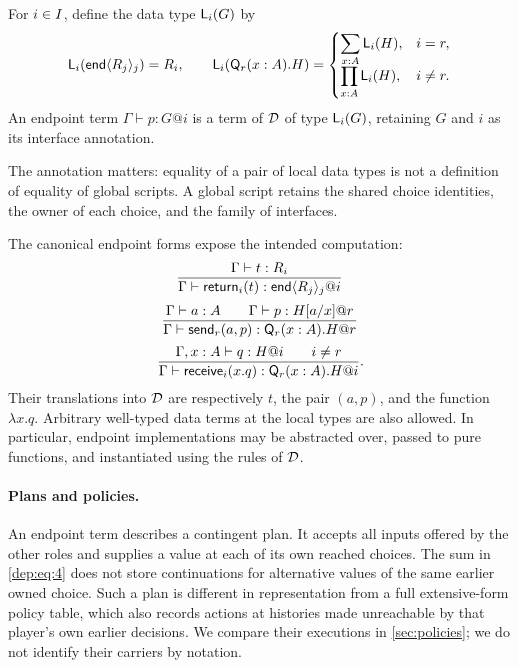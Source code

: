 \begin{definition}
For $i\in I$, define the data type $\mathsf L_{i}(G)$ by
\begin{equation}
 \mathsf L_{i}(\mathsf{end}\langle R_j\rangle_j)=R_i,
 \qquad
 \mathsf L_{i}(\mathsf Q_r(x:A).H)=
 \begin{cases}
   \displaystyle\sum_{x:A}\mathsf L_{i}(H),&i=r,\\[3pt]
   \displaystyle\prod_{x:A}\mathsf L_{i}(H),&i\ne r.
 \end{cases}
 \label{dep:eq:4}
\end{equation}
An endpoint term $\Gamma\vdash p:G@i$ is a term of $\mathcal D$ of type
$\mathsf L_{i}(G)$, retaining $G$ and $i$ as its interface annotation.
\end{definition}

The annotation matters: equality of a pair of local data types is not a
definition of equality of global scripts. A global script retains the shared
choice identities, the owner of each choice, and the family of interfaces.

The canonical endpoint forms expose the intended computation:
\begin{equation}
 \frac{\Gamma\vdash t:R_i}
      {\Gamma\vdash\mathsf{return}_i(t):\mathsf{end}\langle R_j\rangle_j@i}
 \label{dep:eq:5}
\end{equation}
\begin{equation}
 \frac{\Gamma\vdash a:A\qquad\Gamma\vdash p:H[a/x]@r}
      {\Gamma\vdash\mathsf{send}_r(a,p):\mathsf Q_r(x:A).H@r}
 \label{dep:eq:6}
\end{equation}
\begin{equation}
 \frac{\Gamma,x:A\vdash q:H@i\qquad i\ne r}
      {\Gamma\vdash\mathsf{receive}_i(x.q):\mathsf Q_r(x:A).H@i}.
 \label{dep:eq:7}
\end{equation}
Their translations into $\mathcal D$ are respectively $t$, the pair $(a,p)$, and the
function $\lambda x.q$. Arbitrary well-typed data terms at the local types are
also allowed. In particular, endpoint implementations may be abstracted over,
passed to pure functions, and instantiated using the rules of $\mathcal D$.

\paragraph{Plans and policies.}
An endpoint term describes a contingent plan. It accepts all inputs offered by
the other roles and supplies a value at each of its own reached choices. The
sum in \eqref{dep:eq:4} does not store continuations for alternative values of the same
earlier owned choice. Such a plan is different in representation from a full
extensive-form policy table, which also records actions at histories made
unreachable by that player's own earlier decisions. We compare their
executions in \cref{sec:policies}; we do not identify their carriers by
notation.

